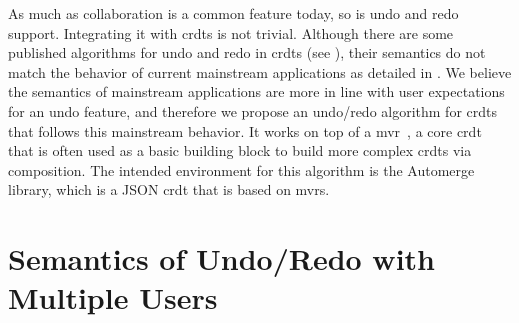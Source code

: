 \documentclass[sigplan,natbib=false,review]{acmart}
\begin{document}
As much as collaboration is a common feature today, so is undo and redo support.
Integrating it with \glspl*{crdt} is not trivial.
Although there are some published algorithms for undo and redo in \glspl*{crdt}
(see ),
their semantics do not match the behavior of current mainstream applications
as detailed in .
We believe the semantics of mainstream applications are more in line with
user expectations for an undo feature, and therefore we propose an undo/redo
algorithm for \glspl{crdt} that follows this mainstream behavior.
It works on top of a \gls*{mvr}~\cite{shapiro2011comprehensive},
a core \gls*{crdt} that is often used as a basic
building block to build more complex \glspl*{crdt} via composition.
The intended environment for this algorithm is the Automerge~\cite{automerge} library,
which is a JSON \gls*{crdt} that is based on \glspl*{mvr}.

\section{Semantics of Undo/Redo with Multiple Users}\label{sec:semantics}
\end{document}
